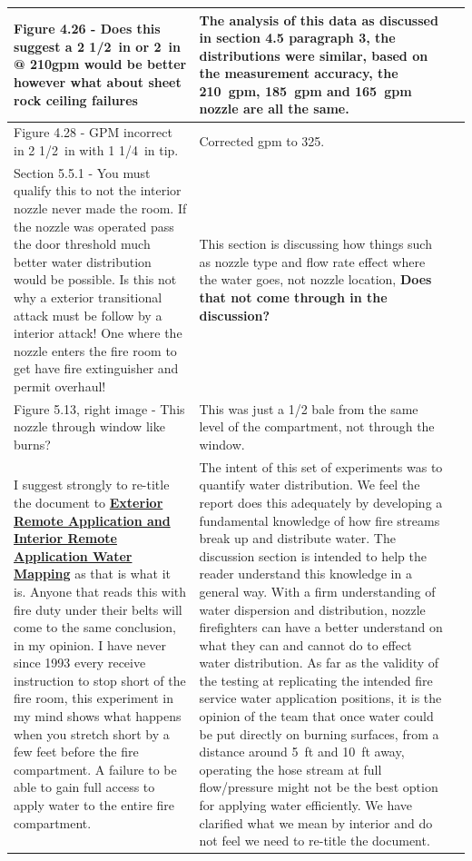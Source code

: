 \documentclass[12pt,oneside]{book}
\begin{document}
\begin{landscape}
\begin{longtable}{|L{4in}|L{3.75in}|c|}
		\hline
		Figure 4.26 - Does this suggest a 2 1/2~in or 2~in @ 210gpm would be better however what about sheet rock ceiling failures & 
		The analysis of this data as discussed in section 4.5 paragraph 3, the distributions were similar, based on the measurement accuracy, the 210~gpm, 185~gpm and 165~gpm nozzle are all the same.  & \\

		\hline
		Figure 4.28 - GPM incorrect in 2 1/2~in with 1 1/4~in tip. &
		Corrected gpm to 325. & \\

		\hline
		Section 5.5.1 - You must qualify this to not the interior nozzle never made the room. If the nozzle was operated pass the door threshold much better water distribution would be possible. Is this not why a exterior transitional attack must be follow by a interior attack! One where the nozzle enters the fire room to get have fire extinguisher and permit overhaul! &
		This section is discussing how things such as nozzle type and flow rate effect where the water goes, not nozzle location, \textbf{Does that not come through in the discussion?} & \\

		\hline
		Figure 5.13, right image - This nozzle through window like burns? & 
		This was just a 1/2 bale from the same level of the compartment, not through the window. & \\

		\hline
		I suggest strongly to re-title the document to \textbf{\ul{Exterior Remote Application and Interior Remote Application Water Mapping}} as that is what it is.  Anyone that reads this with fire duty under their belts will come to the same conclusion, in my opinion.  I have never since 1993 every receive instruction to stop short of the fire room, this experiment in my mind shows what happens when you stretch short by a few feet before the fire compartment.  A failure to be able to gain full access to apply water to the entire fire compartment.    & 
		The intent of this set of experiments was to quantify water distribution. We feel the report does this adequately by developing a fundamental knowledge of how fire streams break up and distribute water. The discussion section is intended to help the reader understand this knowledge in a general way. With a firm understanding of water dispersion and distribution, nozzle firefighters can have a better understand on what they can and cannot do to effect water distribution. As far as the validity of the testing at replicating the intended fire service water application positions, it is the opinion of the team that once water could be put directly on burning surfaces, from a distance around 5~ft and 10~ft away, operating the hose stream at full flow/pressure might not be the best option for applying water efficiently. We have clarified what we mean by interior and do not feel we need to re-title the document. & \checkmark \\


\end{longtable}
\end{landscape}
\end{document}
